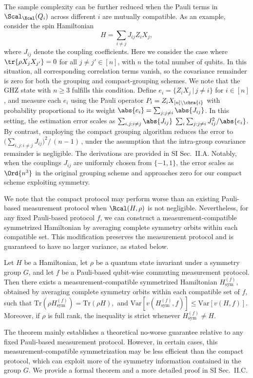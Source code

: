 \documentclass[prl,aps,twocolumn,notitlepage,superscriptaddress,showpacs,nofootinbib]{revtex4-2}
\newcommand{\red}[1]{{\color{red} #1}}
\begin{document}
The sample complexity can be further reduced when the Pauli terms in $\Scal_{\Xcal}(Q_i)$ across different $i$ are mutually compatible. As an example, consider the spin Hamiltonian
\begin{equation}
    H = \sum_{i\neq j} J_{ij} Z_i X_j ,
    \label{eq:spin_Ham}
\end{equation}
where $J_{ij}$ denote the coupling coefficients. 
Here we consider the case where $\tr{\rho X_j X_{j'}} = 0$ for all $j \neq j' \in [n]$, with $n$ the total number of qubits. In this situation, all corresponding correlation terms vanish, so the covariance remainder is zero for both the grouping and compact-grouping schemes. We note that the GHZ state with $n\geq 3$ fulfills this condition.
Define $e_i = \{Z_i X_j \,|\, j \neq i\}$ for $i \in [n]$, and measure each $e_i$ using the Pauli operator $P_i = Z_i X_{[n]\setminus \cbra{i}}$ with probability proportional to its weight $\abs{e_i} = \sum_{j:j\ne i} \abs{J_{ij}}$. In this setting, the estimation error scales as $
    \sum_{i,j:i\ne j} \abs{J_{ij}} \; \sum_{i} {\sum_{j:j\ne i} J_{ij}^2}/{\abs{e_i}}$.
By contrast, employing the compact grouping algorithm reduces the error to $({\sum_{i,j:i\ne j} J_{ij})^2}/{\,(n-1)\,}$,
under the assumption that the intra-group covariance remainder is negligible.
The derivations are provided in SI Sec.~II.A. Notably, when the couplings $J_{ij}$ are uniformly chosen from $\{-1,1\}$, the error scales as \red{$\Ord{n^3}$ in the original grouping scheme} and approaches zero for our compact scheme exploiting symmetry.

\red{
We note that the compact protocol may perform worse than an existing Pauli-based measurement protocol when \(\Rcal(H,\rho)\) is not negligible. Nevertheless, for any fixed Pauli-based protocol \(f\), we can construct a measurement-compatible symmetrized Hamiltonian by averaging complete symmetry orbits within each compatible set. This modification preserves the measurement protocol and is guaranteed to have no larger variance, as stated below.
}

\red{\begin{theorem}
Let \(H\) be a Hamiltonian, let \(\rho\) be a quantum state invariant under a symmetry group \(G\), and let \(f\) be a Pauli-based qubit-wise commuting measurement protocol. Then there exists a measurement-compatible symmetrized Hamiltonian \(H_{\mathrm{sym}}^{(f)}\), obtained by averaging complete symmetry orbits within each compatible set of \(f\), such that $ \mathrm{Tr} \left(\rho H_{\mathrm{sym}}^{(f)}\right)
    =
    \mathrm{Tr}(\rho H),$
and $ \mathrm{Var}\!\left[v(H_{\mathrm{sym}}^{(f)},f)\right]
    \le
    \mathrm{Var}\!\left[v(H,f)\right].$
Moreover, if \(\rho\) is full rank, the inequality is strict whenever \(H_{\mathrm{sym}}^{(f)}\neq H\).
\label{thm:symmetric_average_advantages}
\end{theorem}}
\red{The theorem mainly establishes a theoretical no-worse guarantee relative to any fixed Pauli-based measurement protocol. However, in certain cases, this measurement-compatible symmetrization may be less efficient than the compact protocol, which can exploit more of the symmetry information contained in the group $G$.
We provide a formal theorem and a more detailed proof in SI Sec.~II.C.}
\end{document}
